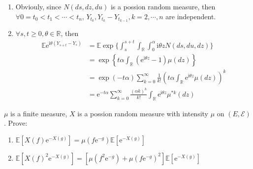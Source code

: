 \documentclass{ctexart}
\begin{document}
\begin{solution}
  \begin{enumerate}
    \item Obviouly, since \(N(ds,dz,du)\) is a possion random measure, then \(\forall 0=t_0<t_1<\cdots<t_n\),
      \(Y_{t_0}, Y_{t_{k}}-Y_{t_{k-1}},k=2,\cdots,n\) are independent.
    \item \(\forall s,t \geq 0, \theta \in \mathbb{R}\), then
      \begin{equation}
        \begin{aligned}
          \mathbb{E}\mathrm{e}^{\mathrm{i}\theta(Y_{s + t}-Y_s)} & =\mathbb{E}\exp\{\int_{s}^{s + t}\int_{\mathbb{R}}\int_{0}^{\alpha}\mathrm{i}\theta z N(ds,du,dz)\}                                \\
                                                                 & = \exp\left\{t \alpha\int_{\mathbb{R}}(\mathrm{e}^{\mathrm{i}\theta z}-1) \mu(dz)\right\}                                          \\
                                                                 & =\exp(-t \alpha)\sum_{k=0}^{\infty} \frac{1}{k!}(t \alpha \int_{\mathbb{R}}\mathrm{e}^{\mathrm{i} \theta z} \mu( d z))^k           \\
                                                                 & =\mathrm{e}^{-t \alpha}\sum_{k=0}^{\infty} \frac{(\alpha k)^k}{k!}\int_{\mathbb{R}}\mathrm{e}^{\mathrm{i} \theta z} \mu^{* k}(d z)
        \end{aligned}
      \end{equation}
  \end{enumerate}

\end{solution}
\begin{problem}\label{pro:5}
  \(\mu\) is a finite measure, \(X\) is a possion random measure with intensity \(\mu\) on \((E,\mathscr{E})\).
  Prove:
  \begin{enumerate}
    \item \(\mathbb{E}[X(f)\mathrm{e}^{-X(g)}]=\mu(f \mathrm{e}^{-g})\mathbb{E}[\mathrm{e}^{-X(g)}]\)
    \item \(\mathbb{E}[X(f)^2\mathrm{e}^{-X(g)}]=[\mu(f^2 \mathrm{e}^{-g}) + \mu(f \mathrm{e}^{-g})^2]\mathbb{E}[\mathrm{e}^{-X(g)}]\)
  \end{enumerate}

\end{problem}
\end{document}
